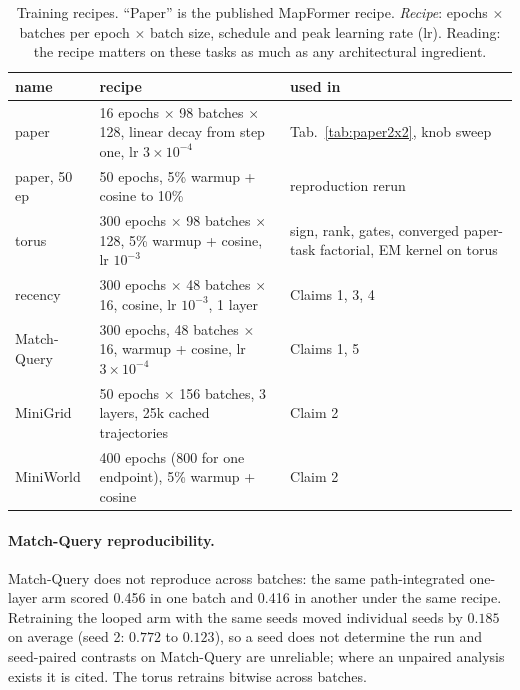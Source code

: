 \documentclass[10pt]{article}
\begin{document}
\begin{table}[t]
\centering
\small
\captionsetup{font=footnotesize,skip=4pt}
\caption{Training recipes. ``Paper'' is the published MapFormer recipe. \emph{Recipe}: epochs $\times$ batches per epoch $\times$ batch size, schedule and peak learning rate (lr). Reading: the recipe matters on these tasks as much as any architectural ingredient.}
\label{tab:recipes}
\begin{tabular}{@{}lp{8.6cm}>{\raggedright\arraybackslash}p{3.4cm}@{}}
\toprule
name & recipe & used in \\
\midrule
paper & 16 epochs $\times$ 98 batches $\times$ 128, linear decay from step one, lr $3\times10^{-4}$ & Tab.~\ref{tab:paper2x2}, knob sweep \\
paper, 50 ep & 50 epochs, 5\% warmup + cosine to 10\% & reproduction rerun \\
torus & 300 epochs $\times$ 98 batches $\times$ 128, 5\% warmup + cosine, lr $10^{-3}$ & sign, rank, gates, converged paper-task factorial, EM kernel on torus \\
recency & 300 epochs $\times$ 48 batches $\times$ 16, cosine, lr $10^{-3}$, 1 layer & Claims 1, 3, 4 \\
Match-Query & 300 epochs, 48 batches $\times$ 16, warmup + cosine, lr $3\times10^{-4}$ & Claims 1, 5 \\
MiniGrid & 50 epochs $\times$ 156 batches, 3 layers, 25k cached trajectories & Claim 2 \\
MiniWorld & 400 epochs (800 for one endpoint), 5\% warmup + cosine & Claim 2 \\
\bottomrule
\end{tabular}
\end{table}

\paragraph{Match-Query reproducibility.} Match-Query does not reproduce across batches: the same
path-integrated one-layer arm scored 0.456 in one batch and 0.416 in another under the same recipe.
Retraining the looped arm with the same seeds moved individual seeds by $0.185$ on average (seed 2: $0.772$
to $0.123$), so a seed does not determine the run and seed-paired contrasts on Match-Query are unreliable;
where an unpaired analysis exists it is cited. %
The torus retrains bitwise across batches.

\end{document}
